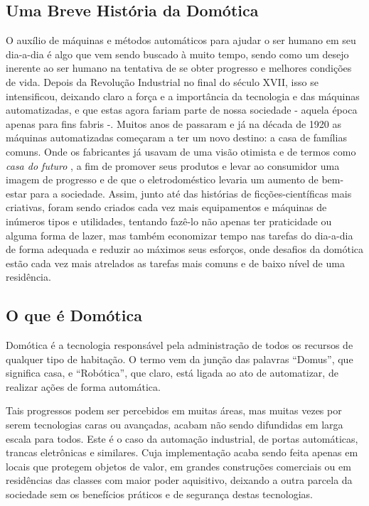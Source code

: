 \documentclass[a4paper,12pt]{article}
\begin{document}
\subsection{Uma Breve História da Domótica}
O auxílio de máquinas e métodos automáticos para ajudar o ser humano em seu dia-a-dia é algo que vem sendo buscado à muito tempo, sendo como um desejo inerente ao ser humano na tentativa de se obter progresso e melhores condições de vida. Depois da Revolução Industrial no final do século XVII, isso se intensificou, deixando claro a força e a importância da tecnologia e das máquinas automatizadas, e que estas agora fariam parte de nossa sociedade - aquela época apenas para fins fabris \cite{hobsbawm1} -. Muitos anos de passaram e já na década de 1920 as máquinas automatizadas começaram a ter um novo destino: a casa de famílias comuns. Onde os fabricantes já usavam de uma visão otimista e de termos como \textit{casa do futuro} \cite{bolzani}, a fim de promover seus produtos e levar ao consumidor uma imagem de progresso e de que o eletrodoméstico levaria um aumento de bem-estar para a sociedade. Assim, junto até das histórias de ficções-científicas mais criativas, foram sendo criados cada vez mais equipamentos e máquinas de inúmeros tipos e utilidades, tentando fazê-lo não apenas ter praticidade ou alguma forma de lazer, mas também economizar tempo nas tarefas do dia-a-dia de forma adequada e reduzir ao máximos seus esforços, onde desafios da domótica estão cada vez mais atrelados as tarefas mais comuns e de baixo nível de uma residência.

\subsection{O que é Domótica}
Domótica é a tecnologia responsável pela administração de todos os recursos de qualquer tipo de habitação. O termo vem da junção das palavras “Domus”, que significa casa, e “Robótica”, que claro, está ligada ao ato de automatizar, de realizar ações de forma automática. \cite{chamusca}


Tais progressos podem ser percebidos em muitas áreas, mas muitas vezes por serem tecnologias caras ou avançadas, acabam não sendo difundidas em larga escala para todos. Este é o caso da automação industrial, de portas automáticas, trancas eletrônicas e similares. Cuja implementação acaba sendo feita apenas em locais que protegem objetos de valor, em grandes construções comerciais ou em residências das classes com maior poder aquisitivo, deixando a outra parcela da sociedade sem os benefícios práticos e de segurança destas tecnologias.
\end{document}
